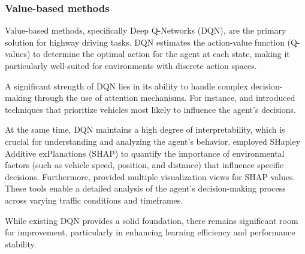 \documentclass{article}
\begin{document}


\subsubsection{Value-based methods}

Value-based methods, specifically Deep Q-Networks (DQN), are the primary solution for highway driving tasks. DQN estimates the action-value function (Q-values) to determine the optimal action for the agent at each state, making it particularly well-suited for environments with discrete action spaces.

A significant strength of DQN lies in its ability to handle complex decision-making through the use of attention mechanisms. For instance, \citep{leurent_social_2019} and \citep{bellotti_designing_2023} introduced techniques that prioritize vehicles most likely to influence the agent’s decisions.  

At the same time, DQN maintains a high degree of interpretability, which is crucial for understanding and analyzing the agent's behavior. \citep{bellotti_explaining_2023} employed SHapley Additive exPlanations (SHAP) to quantify the importance of environmental factors (such as vehicle speed, position, and distance) that influence specific decisions. Furthermore, \citep{bellotti_designing_2023} provided multiple visualization views for SHAP values. These tools enable a detailed analysis of the agent’s decision-making process across varying traffic conditions and timeframes.

While existing DQN provides a solid foundation, there remains significant room for improvement, particularly in enhancing learning efficiency and performance stability. 



\end{document}
